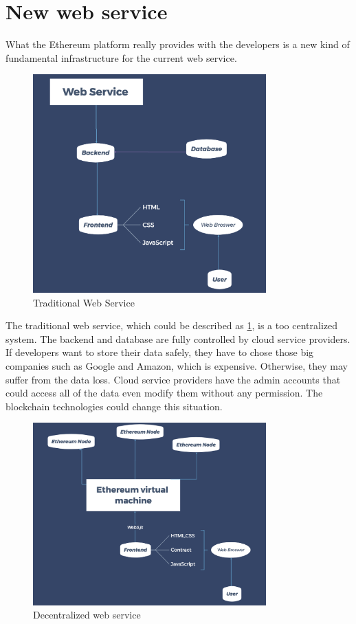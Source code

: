 \documentclass [11pt]{report}
\begin{document}
\section{New web service}
What the Ethereum platform really provides with the developers is a new kind of fundamental infrastructure for the current web service.
\begin{figure}[H]
  \centering
  \includegraphics[width=0.8\textwidth]{triditionalWebService.png}
  \caption{Traditional Web Service}
  \label{service} 
\end{figure} 
The traditional web service, which could be described as \ref{service}, is a too centralized system.
The backend and database are fully controlled by cloud service providers. If developers want to store their data safely, 
they have to chose those big companies such as Google and Amazon, which is expensive. 
Otherwise, they may suffer from the data loss. 
Cloud service providers have the admin accounts that could access all of the data even modify them without any permission.
The blockchain technologies could change this situation. 
\begin{figure}[H]
  \centering
  \includegraphics[width=0.8\textwidth]{EthereumWeb.png}
  \caption{Decentralized web service}
  \label{newservice} 
\end{figure}
\end{document}

